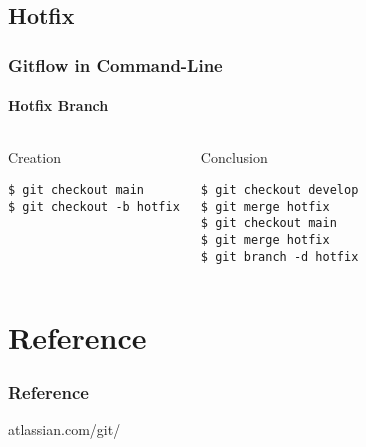 \documentclass[10pt]{beamer}
\begin{document}
	\subsection{Hotfix}
	\begin{frame}[fragile]
		\frametitle{Gitflow in Command-Line}
		\framesubtitle{Hotfix Branch}
		\begin{columns}[t]
			\begin{block}{Creation}
				\small
				\begin{verbatim}
$ git checkout main
$ git checkout -b hotfix
				\end{verbatim}
			\end{block}
			\begin{block}{Conclusion}
				\small
				\begin{verbatim}
$ git checkout develop
$ git merge hotfix
$ git checkout main
$ git merge hotfix
$ git branch -d hotfix
				\end{verbatim}
			\end{block}
		\end{columns}
	\end{frame}
	\section{Reference}
	\begin{frame}
		\frametitle{Reference}
		atlassian.com/git/
	\end{frame}
	\begin{frame}
	\end{frame}
\end{document}

